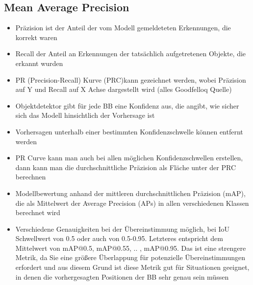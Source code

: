 \subsection{Mean Average Precision}
\begin{itemize}
    \item Präzision ist der Anteil der vom Modell gemeldeteten Erkennungen, die korrekt waren 
    \item Recall der Anteil an Erkennungen der tatsächlich aufgetretenen Objekte, die erkannt wurden
    \item PR (Precision-Recall) Kurve (PRC)kann gezeichnet werden, wobei Präzision auf Y und Recall auf X Achse dargestellt wird (alles Goodfelloq Quelle)
    \item Objektdetektor gibt für jede BB eine Konfidenz aus, die angibt, wie sicher sich das Modell hinsichtlich der Vorhersage ist
    \item Vorhersagen unterhalb einer bestimmten Konfidenzschwelle können entfernt werden
    \item PR Curve kann man auch bei allen möglichen Konfidenzschwellen  erstellen, dann kann man die durchschnittliche Präzision als Fläche unter der PRC berechnen
    \item Modellbewertung anhand der mittleren durchschnittlichen Präzision (mAP), die als Mittelwert der Average Precision (APs) in allen verschiedenen Klassen berechnet wird \cite{Rainio2024}
    \item Verschiedene Genauigkeiten bei der Übereinstimmung möglich, bei IoU Schwellwert von 0.5 oder auch von 0.5-0.95. Letzteres entspricht dem Mittelwert von mAP@0.5, mAP@0.55, .. , mAP@0.95. Das ist eine strengere Metrik, da Sie eine größere Überlappung für potenzielle Übereinstimmungen erfordert und aus diesem Grund ist diese Metrik gut für Situationen geeignet, in denen die vorhergesagten Positionen der BB sehr genau sein müssen
\end{itemize}





